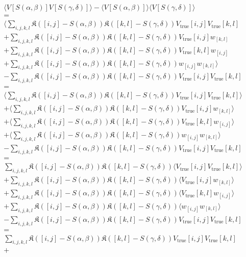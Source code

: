 \documentclass[times]{aastex6}
\begin{document}
\begin{multline*}
   \langle V[S(\alpha, \beta)]V[S(\gamma, \delta)] \rangle - \langle V[S(\alpha, \beta)] \rangle \langle V[S(\gamma, \delta)] \rangle \\ = \\ \langle \sum_{i,j,k,l}\mathfrak{K}([i,j] - S(\alpha,\beta))\mathfrak{K}([k,l] - S(\gamma,\delta))V_{\mathrm{true}}[i,j]V_{\mathrm{true}}[k,l] \\ + \sum_{i,j,k,l}\mathfrak{K}([i,j] - S(\alpha,\beta))\mathfrak{K}([k,l] - S(\gamma,\delta))V_{\mathrm{true}}[i,j]w_{[k,l]} \\ + \sum_{i,j,k,l}\mathfrak{K}([i,j] - S(\alpha,\beta))\mathfrak{K}([k,l] - S(\gamma,\delta))V_{\mathrm{true}}[k,l]w_{[i,j]} \\ + \sum_{i,j,k,l}\mathfrak{K}([i,j] - S(\alpha,\beta))\mathfrak{K}([k,l] - S(\gamma,\delta))w_{[i,j]}w_{[k,l]} \rangle \\ - \sum_{i,j,k,l}\mathfrak{K}([i,j] - S(\alpha,\beta)) \mathfrak{K}([k,l] - S(\gamma,\delta)) V_{\mathrm{true}}[i,j] V_{\mathrm{true}}[k,l] \\ = \\ \langle \sum_{i,j,k,l}\mathfrak{K}([i,j] - S(\alpha,\beta))\mathfrak{K}([k,l] - S(\gamma,\delta))V_{\mathrm{true}}[i,j]V_{\mathrm{true}}[k,l] \rangle \\ + \langle \sum_{i,j,k,l}\mathfrak{K}([i,j] - S(\alpha,\beta))\mathfrak{K}([k,l] - S(\gamma,\delta))V_{\mathrm{true}}[i,j]w_{[k,l]} \rangle \\ + \langle \sum_{i,j,k,l}\mathfrak{K}([i,j] - S(\alpha,\beta))\mathfrak{K}([k,l] - S(\gamma,\delta))V_{\mathrm{true}}[k,l]w_{[i,j]} \rangle \\ + \langle \sum_{i,j,k,l}\mathfrak{K}([i,j] - S(\alpha,\beta))\mathfrak{K}([k,l] - S(\gamma,\delta))w_{[i,j]}w_{[k,l]} \rangle \\ - \sum_{i,j,k,l}\mathfrak{K}([i,j] - S(\alpha,\beta)) \mathfrak{K}([k,l] - S(\gamma,\delta)) V_{\mathrm{true}}[i,j] V_{\mathrm{true}}[k,l] \\ = \\ \sum_{i,j,k,l}\mathfrak{K}([i,j] - S(\alpha,\beta))\mathfrak{K}([k,l] - S(\gamma,\delta)) \langle V_{\mathrm{true}}[i,j]V_{\mathrm{true}}[k,l] \rangle \\ + \sum_{i,j,k,l}\mathfrak{K}([i,j] - S(\alpha,\beta))\mathfrak{K}([k,l] - S(\gamma,\delta)) \langle V_{\mathrm{true}}[i,j]w_{[k,l]} \rangle \\ + \sum_{i,j,k,l}\mathfrak{K}([i,j] - S(\alpha,\beta))\mathfrak{K}([k,l] - S(\gamma,\delta)) \langle V_{\mathrm{true}}[k,l]w_{[i,j]} \rangle \\ + \sum_{i,j,k,l}\mathfrak{K}([i,j] - S(\alpha,\beta))\mathfrak{K}([k,l] - S(\gamma,\delta)) \langle w_{[i,j]}w_{[k,l]} \rangle \\ - \sum_{i,j,k,l}\mathfrak{K}([i,j] - S(\alpha,\beta)) \mathfrak{K}([k,l] - S(\gamma,\delta)) V_{\mathrm{true}}[i,j] V_{\mathrm{true}}[k,l] \\ = \\ \sum_{i,j,k,l}\mathfrak{K}([i,j] - S(\alpha,\beta))\mathfrak{K}([k,l] - S(\gamma,\delta)) V_{\mathrm{true}}[i,j]V_{\mathrm{true}}[k,l] \\ + 
\end{multline*}
\end{document}
